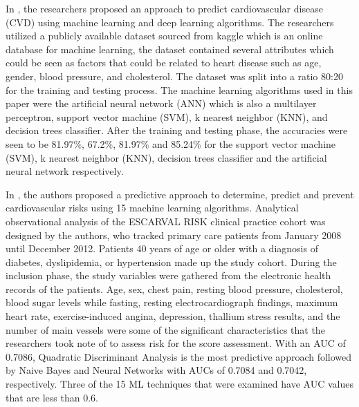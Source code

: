 \documentclass[12pt, a4paper,twoside]{report}
\numberwithin{equation}{chapter}
\begin{document}
In \cite{pasha2020cardiovascular}, the researchers proposed an approach to predict cardiovascular disease (CVD) using machine learning and deep learning algorithms. The researchers utilized a publicly available dataset sourced from kaggle which is an online database for machine learning, the dataset contained several attributes which could be seen as factors that could be related to heart disease such as age, gender, blood pressure, and cholesterol. The dataset was split into a ratio 80:20 for the training and testing process. The machine learning algorithms used in this paper were the artificial neural network (ANN) which is also a multilayer perceptron, support vector machine (SVM), k nearest neighbor (KNN), and decision trees classifier. After the training and testing phase, the accuracies were seen to be 81.97\%, 67.2\%, 81.97\% and 85.24\% for the support vector machine (SVM), k nearest neighbor (KNN), decision trees classifier and the artificial neural network respectively.

In \cite{quesada2019machine}, the authors proposed a predictive approach to determine, predict and prevent cardiovascular risks using 15 machine learning algorithms. Analytical observational analysis of the ESCARVAL RISK clinical practice cohort was designed by the authors, who tracked primary care patients from January 2008 until December 2012. Patients 40 years of age or older with a diagnosis of diabetes, dyslipidemia, or hypertension made up the study cohort. During the inclusion phase, the study variables were gathered from the electronic health records of the patients. Age, sex, chest pain, resting blood pressure, cholesterol, blood sugar levels while fasting, resting electrocardiograph findings, maximum heart rate, exercise-induced angina, depression, thallium stress results, and the number of main vessels were some of the significant characteristics that the researchers took note of to assess risk for the score assessment. With an AUC of 0.7086, Quadratic Discriminant Analysis is the most predictive approach followed by Naive Bayes and Neural Networks with AUCs of 0.7084 and 0.7042, respectively. Three of the 15 ML techniques that were examined have AUC values that are less than 0.6.
\end{document}
